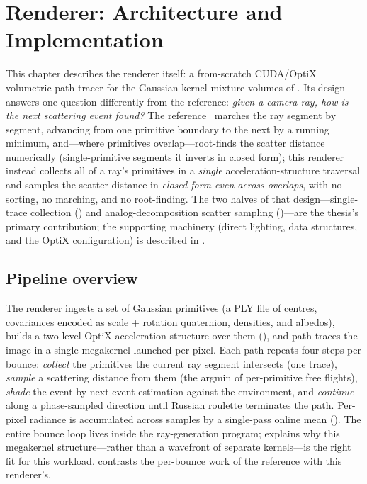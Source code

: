 \chapter{Renderer: Architecture and Implementation}
\label{ch:architecture}

This chapter describes the renderer itself: a from-scratch CUDA/OptiX volumetric path tracer for the
Gaussian kernel-mixture volumes of . Its design answers one question
differently from the reference: \emph{given a camera ray, how is the next scattering event found?}
The reference~\cite{DSYG} marches the ray segment by segment, advancing from one primitive
boundary to the next by a running minimum, and---where primitives overlap---root-finds the scatter
distance numerically (single-primitive segments it inverts in closed form); this renderer instead collects all of a ray's
primitives in a \emph{single} acceleration-structure traversal and samples the scatter distance in
\emph{closed form even across overlaps}, with no sorting, no marching, and no root-finding. The two halves of that
design---single-trace collection () and analog-decomposition scatter sampling
()---are the thesis's primary contribution; the supporting machinery (direct lighting,
data structures, and the OptiX configuration) is described in
.

\section{Pipeline overview}
\label{sec:pipeline}

The renderer ingests a set of Gaussian primitives (a PLY file of centres, covariances encoded as
scale + rotation quaternion, densities, and albedos), builds a two-level OptiX acceleration structure
over them (), and path-traces the image in a single megakernel launched per pixel.
Each path repeats four steps per bounce: \emph{collect} the primitives the current ray segment
intersects (one trace), \emph{sample} a scattering distance from them (the argmin of per-primitive
free flights), \emph{shade} the event by next-event estimation against the environment, and
\emph{continue} along a phase-sampled direction until Russian roulette terminates the path. Per-pixel
radiance is accumulated across samples by a single-pass online mean (). The
entire bounce loop lives inside the ray-generation program;  explains why this
megakernel structure---rather than a wavefront of separate kernels---is the right fit for this
workload.  contrasts the per-bounce work of the reference with this renderer's.

